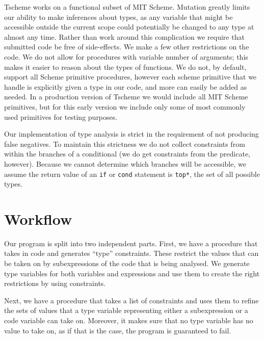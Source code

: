 \documentclass[a4paper]{article}
\begin{document}
Tscheme works on a functional subset of MIT Scheme.  Mutation greatly limits 
our ability to make inferences about types, as any variable that might be 
accessible outside the current scope could potentially be changed to any type 
at almost any time.  Rather than work around this complication we require that
submitted code be free of side-effects.  We make a few other restrictions on 
the code.  We do not allow for procedures with variable number of arguments;
this makes it easier to reason about the types of functions.  We do not, by 
default, support all Scheme primitive procedures, however each scheme 
primitive that we handle is explicitly given a type in our code, and more can 
easily be added as needed.  In a production version of Tscheme we would 
include all MIT Scheme primitives, but for this early version we include only 
some of most commonly used primitives for testing purposes.

Our implementation of type analysis is strict in the requirement of not producing 
false negatives.  To maintain this strictness we do not collect constraints 
from within the branches of a conditional (we do get constraints from the 
predicate, however).  Because we cannot determine which branches will be 
accessible, we assume the return value of an {\tt if} or {\tt cond}
statement is {\tt *top*}, the set of all possible types.


\section{Workflow}

Our program is split into two independent parts.
First, we have a procedure that takes in code and generates ``type'' constraints.
These restrict the values that can be taken on by subexpressions of the
code that is being analysed.
We generate type variables for both variables and expressions
and use them to create the right restrictions by using constraints.

Next, we have a procedure that takes a list of constraints and uses them to
refine the sets of values that a type variable representing either a subexpression
or a code variable can take on.
Moreover, it makes sure that no type variable has no value to take on,
as if that is the case, the program is guaranteed to fail.
\end{document}
